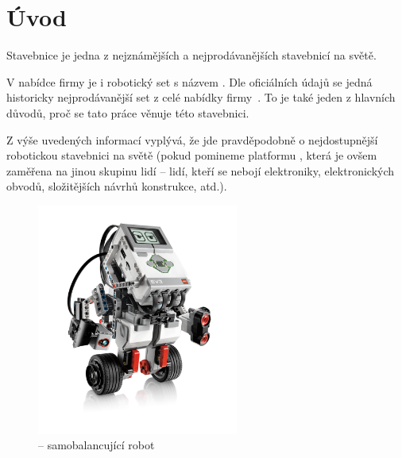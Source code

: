 \chapter{Úvod}

Stavebnice \lego{ }je jedna z nejznámějších a nejprodávanějších stavebnicí na světě. 

% 
% 
% 
% 
%
%

V nabídce firmy \lego{ }je i robotický set s názvem \legoM. 
% 
% 
% 
%
%
Dle oficiálních údajů se jedná historicky nejprodávanější set z celé nabídky firmy~\cite{legoGizmodo_SalesStatistic}. 
To je také jeden z hlavních důvodů, proč se tato práce věnuje této stavebnici. 

Z výše uvedených informací vyplývá, že jde pravděpodobně o nejdostupnější robotickou stavebnici na světě (pokud pomineme platformu \arduino, která je ovšem zaměřena na jinou skupinu lidí -- lidí, kteří se nebojí elektroniky, elektronických obvodů, složitějších návrhů konstrukce, atd.).
% 
% 
%
%

\begin{figure}[h]
	\centering
	\includegraphics[width=250px]{images/lego-mindstorms-ev3_Robotics-for-Kids.png}
	\caption[\legoEV{ }-- samobalancující robot]{\legoEV{ }-- samobalancující robot\protect\footnotemark}
	\label{fig:lego-mindstorms-ev3_Robotics-for-Kids}
\end{figure}


